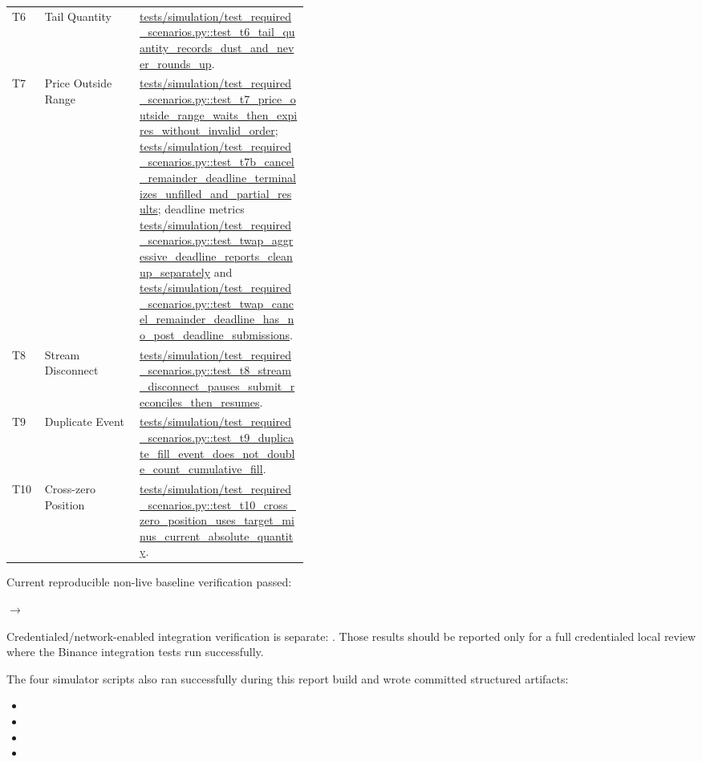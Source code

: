 \begin{table}[htbp]
\begin{tabularx}{\linewidth}{>{\raggedright\arraybackslash}p{0.11\linewidth} >{\raggedright\arraybackslash}p{0.32\linewidth} X}
T6 & Tail Quantity & \url{tests/simulation/test_required_scenarios.py::test_t6_tail_quantity_records_dust_and_never_rounds_up}. \\
T7 & Price Outside Range & \url{tests/simulation/test_required_scenarios.py::test_t7_price_outside_range_waits_then_expires_without_invalid_order}; \url{tests/simulation/test_required_scenarios.py::test_t7b_cancel_remainder_deadline_terminalizes_unfilled_and_partial_results}; deadline metrics \url{tests/simulation/test_required_scenarios.py::test_twap_aggressive_deadline_reports_cleanup_separately} and \url{tests/simulation/test_required_scenarios.py::test_twap_cancel_remainder_deadline_has_no_post_deadline_submissions}. \\
T8 & Stream Disconnect & \url{tests/simulation/test_required_scenarios.py::test_t8_stream_disconnect_pauses_submit_reconciles_then_resumes}. \\
T9 & Duplicate Event & \url{tests/simulation/test_required_scenarios.py::test_t9_duplicate_fill_event_does_not_double_count_cumulative_fill}. \\
T10 & Cross-zero Position & \url{tests/simulation/test_required_scenarios.py::test_t10_cross_zero_position_uses_target_minus_current_absolute_quantity}. \\
\bottomrule
\end{tabularx}
\end{table}

Current reproducible non-live baseline verification passed:

\begin{center}
 \quad \(\rightarrow\) \quad {}
\end{center}

Credentialed/network-enabled integration verification is separate: . Those results should be reported only for a full credentialed local review where the Binance integration tests run successfully.

The four simulator scripts also ran successfully during this report build and wrote committed structured artifacts:

\begin{itemize}[leftmargin=1.2em]
  \item {}
  \item {}
  \item {}
  \item {}
\end{itemize}

